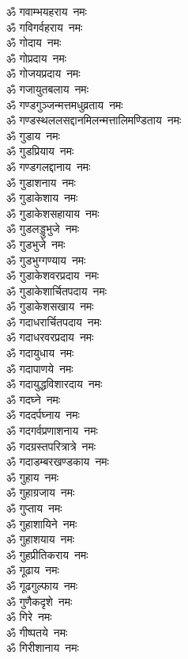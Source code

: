 \begin{multicols}{2}
\begin{flushleft}
ॐ गवाम्भयहराय~नमः\\
ॐ गविगर्वहराय~नमः\\
ॐ गोदाय~नमः\\
ॐ गोप्रदाय~नमः\\
ॐ गोजयप्रदाय~नमः\\
ॐ गजायुतबलाय~नमः\\
ॐ गण्डगुञ्जन्मत्तमधुव्रताय~नमः\\
ॐ गण्डस्थललसद्दान\-मिलन्मत्तालि\-मण्डिताय~नमः\\
ॐ गुडाय~नमः\\
ॐ गुडप्रियाय~नमः\hfill{}\\
ॐ गण्डगलद्दानाय~नमः\\
ॐ गुडाशनाय~नमः\\
ॐ गुडाकेशाय~नमः\\
ॐ गुडाकेशसहायाय~नमः\\
ॐ गुडलड्डुभुजे~नमः\\
ॐ गुडभुजे~नमः\\
ॐ गुडभुग्गण्याय~नमः\\
ॐ गुडाकेशवरप्रदाय~नमः\\
ॐ गुडाकेशार्चितपदाय~नमः\\
ॐ गुडाकेशसखाय~नमः\hfill{}\\
ॐ गदाधरार्चितपदाय~नमः\\
ॐ गदाधरवरप्रदाय~नमः\\
ॐ गदायुधाय~नमः\\
ॐ गदापाणये~नमः\\
ॐ गदायुद्धविशारदाय~नमः\\
ॐ गदघ्ने~नमः\\
ॐ गददर्पघ्नाय~नमः\\
ॐ गदगर्वप्रणाशनाय~नमः\\
ॐ गदग्रस्तपरित्रात्रे~नमः\\
ॐ गदाडम्बरखण्डकाय~नमः\hfill{}\\
ॐ गुहाय~नमः\\
ॐ गुहाग्रजाय~नमः\\
ॐ गुप्ताय~नमः\\
ॐ गुहाशायिने~नमः\\
ॐ गुहाशयाय~नमः\\
ॐ गुहप्रीतिकराय~नमः\\
ॐ गूढाय~नमः\\
ॐ गूढगुल्फाय~नमः\\
ॐ गुणैकदृशे~नमः\\
ॐ गिरे~नमः\hfill{}\\
ॐ गीष्पतये~नमः\\
ॐ गिरीशानाय~नमः\\

\end{flushleft}
\end{multicols}
